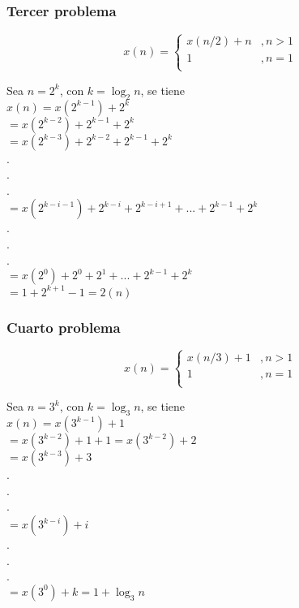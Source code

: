 \documentclass[12pt,twoside]{article}
\begin{document}
\subsubsection{Tercer problema}
\begin{equation}
  x(n) =
    \begin{cases}
      x(n/2) + n &, n>1\\
      1 &, n=1\\
    \end{cases}
\end{equation}
\begin{center}
    Sea $n = 2^k$, con $k = \log_2n$, se tiene\\
    $x(n) = x(2^{k-1}) + 2^k$\\
    $= x(2^{k-2}) + 2^{k-1} + 2^k$\\
    $= x(2^{k-3}) + 2^{k-2} + 2^{k-1} + 2^k$\\.\\.\\.\\
    $= x(2^{k-i-1}) + 2^{k-i} + 2^{k-i+1} + ... + 2^{k-1} + 2^k$\\.\\.\\.\\
    $= x(2^0) + 2^0 + 2^1 + ... + 2^{k-1} + 2^k$\\
    $= 1 + 2^{k+1} - 1 = 2(n)$
\end{center}
\subsubsection{Cuarto problema}
\begin{equation}
  x(n) =
    \begin{cases}
      x(n/3) + 1 &, n>1\\
      1 &, n=1\\
    \end{cases}
\end{equation}
\begin{center}
    Sea $n = 3^k$, con $k = \log_3n$, se tiene\\
    $x(n) = x(3^{k-1}) + 1$\\
    $= x(3^{k-2}) + 1 + 1 = x(3^{k-2}) + 2$\\
    $= x(3^{k-3}) + 3$\\.\\.\\.\\
    $= x(3^{k-i}) + i$\\.\\.\\.\\
    $= x(3^0) + k = 1 + \log_3n$
\end{center}
\end{document}
